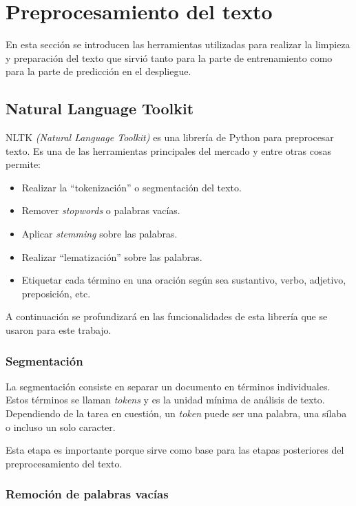 \section{Preprocesamiento del texto}

En esta sección se introducen las herramientas utilizadas para realizar la limpieza y preparación del texto que sirvió tanto para la parte de entrenamiento como para la parte de predicción en el despliegue.

\subsection{Natural Language Toolkit}

NLTK \textit{(Natural Language Toolkit)} es una librería de Python para preprocesar texto. Es una de las herramientas principales del mercado y entre otras cosas permite:
\begin{itemize}
\item Realizar la ``tokenización'' o segmentación del texto.
\item Remover \textit{stopwords} o palabras vacías.
\item Aplicar \textit{stemming} sobre las palabras.
\item Realizar ``lematización'' sobre las palabras.
\item Etiquetar cada término en una oración según sea sustantivo, verbo, adjetivo, preposición, etc.
\end{itemize}

A continuación se profundizará en las funcionalidades de esta librería que se usaron para este trabajo.

\subsubsection{Segmentación}

La segmentación consiste en separar un documento en términos individuales. Estos términos se llaman \textit{tokens} y es la unidad mínima de análisis de texto. Dependiendo de la tarea en cuestión, un \textit{token} puede ser una palabra, una sílaba o incluso un solo caracter.

Esta etapa es importante porque sirve como base para las etapas posteriores del preprocesamiento del texto.

\subsubsection{Remoción de palabras vacías}

